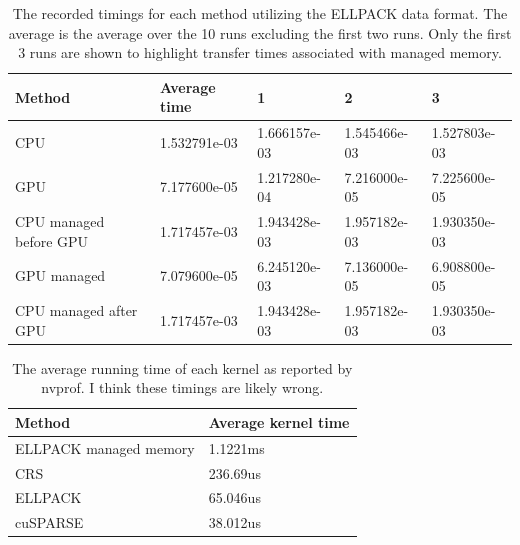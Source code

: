 \documentclass{article}
\begin{document}
\begin{table}[]
  \centering
  \begin{tabular}{|l|l|l|l|l|}
    \hline
    Method                 & Average time & 1            & 2            & 3            \\ \hline
    CPU                    & 1.532791e-03 & 1.666157e-03 & 1.545466e-03 & 1.527803e-03 \\ \hline
    GPU                    & 7.177600e-05 & 1.217280e-04 & 7.216000e-05 & 7.225600e-05 \\ \hline
    CPU managed before GPU & 1.717457e-03 & 1.943428e-03 & 1.957182e-03 & 1.930350e-03 \\ \hline
    GPU managed            & 7.079600e-05 & 6.245120e-03 & 7.136000e-05 & 6.908800e-05 \\ \hline
    CPU managed after GPU  & 1.717457e-03 & 1.943428e-03 & 1.957182e-03 & 1.930350e-03 \\ \hline
  \end{tabular}

  \caption{The recorded timings for each method utilizing the ELLPACK data
    format.
    The average is the average over the 10 runs excluding the first two runs.
    Only the first 3 runs are shown to highlight transfer times associated with
  managed memory.}
\end{table}

\begin{table}[]
  \centering
  \begin{tabular}{|l|l|}
    \hline
    Method                 & Average kernel time \\ \hline
    ELLPACK managed memory & 1.1221ms            \\ \hline
    CRS                    & 236.69us            \\ \hline
    ELLPACK                & 65.046us            \\ \hline
    cuSPARSE               & 38.012us            \\ \hline
  \end{tabular}
  \caption{The average running time of each kernel as reported by nvprof.
    I think these timings are likely wrong.}
\end{table}
\end{document}
